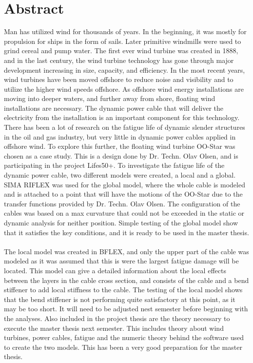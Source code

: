 \chapter*{Abstract}
Man has utilized wind for thousands of years. In the beginning, it was mostly for propulsion for ships in the form of sails. Later primitive windmills were used to grind cereal and pump water. The first ever wind turbine was created in 1888, and in the last century, the wind turbine technology has gone through major development increasing in size, capacity, and efficiency. In the most recent years, wind turbines have been moved offshore to reduce noise and visibility and to utilize the higher wind speeds offshore. As offshore wind energy installations are moving into deeper waters, and further away from shore, floating wind installations are necessary. The dynamic power cable that will deliver the electricity from the installation is an important component for this technology. There has been a lot of research on the fatigue life of dynamic slender structures in the oil and gas industry, but very little in dynamic power cables applied in offshore wind. \newline
\newline
 To explore this further, the floating wind turbine OO-Star was chosen as a case study. This is a design done by Dr. Techn. Olav Olsen, and is participating in the project Lifes50+. To investigate the fatigue life of the dynamic power cable, two different models were created, a local and a global. SIMA RIFLEX was used for the global model, where the whole cable is modeled and is attached to a point that will have the motions of the OO-Star due to the transfer functions provided by Dr. Techn. Olav Olsen. The configuration of the cables was based on a max curvature that could not be exceeded in the static or dynamic analysis for neither position. Simple testing of the global model show that it satisfies the key conditions, and it is ready to be used in the master thesis.\\\\  The local model was created in BFLEX, and only the upper part of the cable was modeled as it was assumed that this is were the largest fatigue damage will be located. This model can give a detailed information about the local effects between the layers in the cable cross section, and consists of the cable and a bend stiffener to add local stiffness to the cable. The testing of the local model shows that the bend stiffener is not performing quite satisfactory at this point, as it may be too short. It will need to be adjusted nest semester before beginning with the analyses.\newline 
\newline
Also included in the project thesis are the theory necessary to execute the master thesis next semester. This includes theory about wind turbines, power cables, fatigue and the numeric theory behind the software used to create the two models. This has been a very good preparation for the master thesis.
